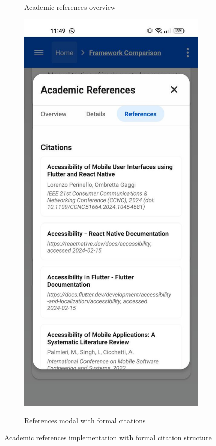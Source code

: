 \begin{figure}[ht]
\begin{subfigure}[b]{0.48\textwidth}
        \caption{Academic references overview}
        \label{fig:academic-references-card}
    \end{subfigure}
    \hfill
    \begin{subfigure}[b]{0.48\textwidth}
        \centering
        \includegraphics[width=\linewidth, alt={Academic References modal dialog showing detailed citations}]{img/methodology-academic-references.jpg}
        \caption{References modal with formal citations}
        \label{fig:academic-references-modal}
    \end{subfigure}
    \caption{Academic references implementation with formal citation structure}
    \label{fig:academic_references}
\end{figure}

